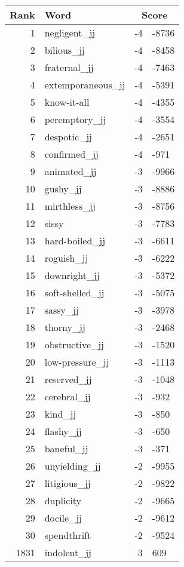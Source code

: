 \begin{longtable}[!htbp]{| rlr@{.}l |}
    \hline
    \textbf{Rank} & \textbf{Word} & \multicolumn{2}{c|}{\textbf{Score}} \\
    \hline
    \endhead
    1 & negligent\_jj & -4 & -8736 \\
    2 & bilious\_jj & -4 & -8458 \\
    3 & fraternal\_jj & -4 & -7463 \\
    4 & extemporaneous\_jj & -4 & -5391 \\
    5 & know-it-all & -4 & -4355 \\
    6 & peremptory\_jj & -4 & -3554 \\
    7 & despotic\_jj & -4 & -2651 \\
    8 & confirmed\_jj & -4 & -971 \\
    9 & animated\_jj & -3 & -9966 \\
    10 & gushy\_jj & -3 & -8886 \\
    11 & mirthless\_jj & -3 & -8756 \\
    12 & sissy & -3 & -7783 \\
    13 & hard-boiled\_jj & -3 & -6611 \\
    14 & roguish\_jj & -3 & -6222 \\
    15 & downright\_jj & -3 & -5372 \\
    16 & soft-shelled\_jj & -3 & -5075 \\
    17 & sassy\_jj & -3 & -3978 \\
    18 & thorny\_jj & -3 & -2468 \\
    19 & obstructive\_jj & -3 & -1520 \\
    20 & low-pressure\_jj & -3 & -1113 \\
    21 & reserved\_jj & -3 & -1048 \\
    22 & cerebral\_jj & -3 & -932 \\
    23 & kind\_jj & -3 & -850 \\
    24 & flashy\_jj & -3 & -650 \\
    25 & baneful\_jj & -3 & -371 \\
    26 & unyielding\_jj & -2 & -9955 \\
    27 & litigious\_jj & -2 & -9822 \\
    28 & duplicity & -2 & -9665 \\
    29 & docile\_jj & -2 & -9612 \\
    30 & spendthrift & -2 & -9524 \\
    1831 & indolent\_jj & 3 & 609 \\

\end{longtable}
